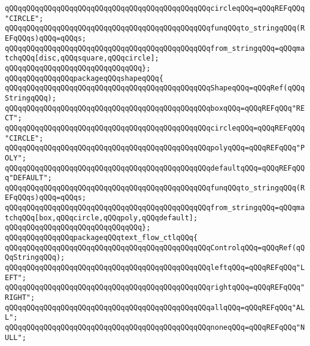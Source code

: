 \verb|qQQqqQQqqQQqqQQqqQQqqQQqqQQqqQQqqQQqqQQqqQQqqQQqcircleqQQq=qQQqREFqQQq"CIRCLE";|\newline
\verb|qQQqqQQqqQQqqQQqqQQqqQQqqQQqqQQqqQQqqQQqqQQqqQQqfunqQQqto_stringqQQq(REFqQQqs)qQQq=qQQqs;|\newline
\verb|qQQqqQQqqQQqqQQqqQQqqQQqqQQqqQQqqQQqqQQqqQQqqQQqfrom_stringqQQq=qQQqmatchqQQq[disc,qQQqsquare,qQQqcircle];|\newline
\verb|qQQqqQQqqQQqqQQqqQQqqQQqqQQqqQQq};|\newline
\newline
\verb|qQQqqQQqqQQqqQQqpackageqQQqshapeqQQq{|\newline
\newline
\verb|qQQqqQQqqQQqqQQqqQQqqQQqqQQqqQQqqQQqqQQqqQQqqQQqShapeqQQq=qQQqRef(qQQqStringqQQq);|\newline
\verb|qQQqqQQqqQQqqQQqqQQqqQQqqQQqqQQqqQQqqQQqqQQqqQQqboxqQQq=qQQqREFqQQq"RECT";|\newline
\verb|qQQqqQQqqQQqqQQqqQQqqQQqqQQqqQQqqQQqqQQqqQQqqQQqcircleqQQq=qQQqREFqQQq"CIRCLE";|\newline
\verb|qQQqqQQqqQQqqQQqqQQqqQQqqQQqqQQqqQQqqQQqqQQqqQQqpolyqQQq=qQQqREFqQQq"POLY";|\newline
\verb|qQQqqQQqqQQqqQQqqQQqqQQqqQQqqQQqqQQqqQQqqQQqqQQqdefaultqQQq=qQQqREFqQQq"DEFAULT";|\newline
\verb|qQQqqQQqqQQqqQQqqQQqqQQqqQQqqQQqqQQqqQQqqQQqqQQqfunqQQqto_stringqQQq(REFqQQqs)qQQq=qQQqs;|\newline
\verb|qQQqqQQqqQQqqQQqqQQqqQQqqQQqqQQqqQQqqQQqqQQqqQQqfrom_stringqQQq=qQQqmatchqQQq[box,qQQqcircle,qQQqpoly,qQQqdefault];|\newline
\verb|qQQqqQQqqQQqqQQqqQQqqQQqqQQqqQQq};|\newline
\newline
\verb|qQQqqQQqqQQqqQQqpackageqQQqtext_flow_ctlqQQq{|\newline
\newline
\verb|qQQqqQQqqQQqqQQqqQQqqQQqqQQqqQQqqQQqqQQqqQQqqQQqControlqQQq=qQQqRef(qQQqStringqQQq);|\newline
\verb|qQQqqQQqqQQqqQQqqQQqqQQqqQQqqQQqqQQqqQQqqQQqqQQqleftqQQq=qQQqREFqQQq"LEFT";|\newline
\verb|qQQqqQQqqQQqqQQqqQQqqQQqqQQqqQQqqQQqqQQqqQQqqQQqrightqQQq=qQQqREFqQQq"RIGHT";|\newline
\verb|qQQqqQQqqQQqqQQqqQQqqQQqqQQqqQQqqQQqqQQqqQQqqQQqallqQQq=qQQqREFqQQq"ALL";|\newline
\verb|qQQqqQQqqQQqqQQqqQQqqQQqqQQqqQQqqQQqqQQqqQQqqQQqnoneqQQq=qQQqREFqQQq"NULL";|\newline
